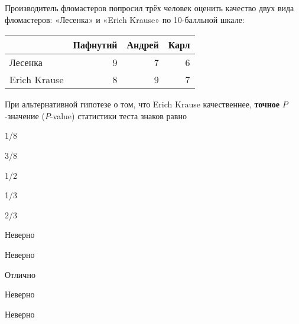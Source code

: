 
\begin{question}
Производитель фломастеров попросил трёх человек оценить качество двух
вида фломастеров: «Лесенка» и «Erich Krause» по 10-балльной шкале:

\begin{center}
\begin{tabular}{lrrr} \toprule
 & Пафнутий & Андрей & Карл \\
\midrule
Лесенка & 9 & 7 & 6 \\
Erich Krause & 8 & 9 & 7 \\
\bottomrule
\end{tabular}
\end{center}

При альтернативной гипотезе о том, что Erich Krause качественнее,
\textbf{точное} \(P\)-значение (\(P\)-value) статистики теста знаков
равно
\begin{answerlist}
  \item 1/8
  \item 3/8
  \item 1/2
  \item 1/3
  \item 2/3
\end{answerlist}
\end{question}

\begin{solution}
\begin{answerlist}
  \item Неверно
  \item Неверно
  \item Отлично
  \item Неверно
  \item Неверно
\end{answerlist}
\end{solution}

